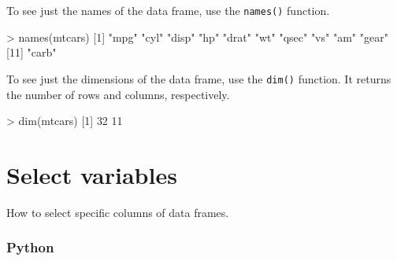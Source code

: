 \documentclass[
]{book}
\newenvironment{Shaded}{\begin{snugshade}}{\end{snugshade}}
\newcommand{\DecValTok}[1]{\textcolor[rgb]{0.00,0.00,0.81}{#1}}
\newcommand{\FunctionTok}[1]{\textcolor[rgb]{0.00,0.00,0.00}{#1}}
\newcommand{\NormalTok}[1]{#1}
\newcommand{\SpecialCharTok}[1]{\textcolor[rgb]{0.00,0.00,0.00}{#1}}
\newcommand{\StringTok}[1]{\textcolor[rgb]{0.31,0.60,0.02}{#1}}
\begin{document}
\begin{Shaded}
\end{Shaded}

To see just the names of the data frame, use the \texttt{names()} function.

\begin{Shaded}
\begin{Highlighting}[]
\SpecialCharTok{\textgreater{}} \FunctionTok{names}\NormalTok{(mtcars)}
\NormalTok{ [}\DecValTok{1}\NormalTok{] }\StringTok{"mpg"}  \StringTok{"cyl"}  \StringTok{"disp"} \StringTok{"hp"}   \StringTok{"drat"} \StringTok{"wt"}   \StringTok{"qsec"} \StringTok{"vs"}   \StringTok{"am"}   \StringTok{"gear"}
\NormalTok{[}\DecValTok{11}\NormalTok{] }\StringTok{"carb"}
\end{Highlighting}
\end{Shaded}

To see just the dimensions of the data frame, use the \texttt{dim()} function. It returns the number of rows and columns, respectively.

\begin{Shaded}
\begin{Highlighting}[]
\SpecialCharTok{\textgreater{}} \FunctionTok{dim}\NormalTok{(mtcars)}
\NormalTok{[}\DecValTok{1}\NormalTok{] }\DecValTok{32} \DecValTok{11}
\end{Highlighting}
\end{Shaded}

\hypertarget{select-variables}{%
\section{Select variables}\label{select-variables}}

How to select specific columns of data frames.

\hypertarget{python-18}{%
\subsubsection*{Python}\label{python-18}}
\end{document}
